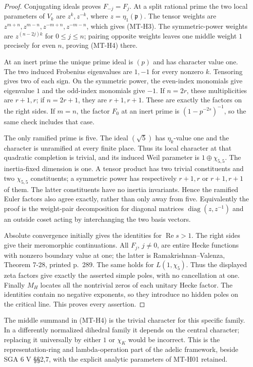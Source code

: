 \begin{proof}
Conjugating ideals proves $F_{-j}=F_j$. At a split rational prime
the two local parameters of $V_k$ are $z^k,z^{-k}$, where
$z=\eta_1(\mathfrak p)$. The tensor weights are
$z^{m+n},z^{m-n},z^{-m+n},z^{-m-n}$, which gives (MT-H3).
The symmetric-power weights are $z^{(n-2j)k}$ for $0\le j\le n$;
pairing opposite weights leaves one middle weight $1$ precisely for
even $n$, proving (MT-H4) there.

At an inert prime the unique prime ideal is $(p)$ and has character
value one. The two induced Frobenius eigenvalues are $1,-1$ for
every nonzero $k$. Tensoring gives two of each sign. On the
symmetric power, the even-index monomials give eigenvalue $1$ and
the odd-index monomials give $-1$. If $n=2r$, these multiplicities
are $r+1,r$; if $n=2r+1$, they are $r+1,r+1$. These are exactly
the factors on the right sides. If $m=n$, the factor $F_0$ at an
inert prime is $(1-p^{-2s})^{-1}$, so the same check includes that
case.

The only ramified prime is five. The ideal $(\sqrt5)$ has
$\eta_k$-value one and the character is unramified at every finite
place. Thus its local character at that quadratic completion is
trivial, and its induced Weil parameter is $1\oplus\chi_{5,5}$.
The inertia-fixed dimension is one. A tensor product has two
trivial constituents and two $\chi_{5,5}$ constituents; a symmetric
power has respectively $r+1,r$ or $r+1,r+1$ of them. The latter
constituents have no inertia invariants. Hence the ramified Euler
factors also agree exactly, rather than only away from five.
Equivalently the proof is the weight-pair decomposition for diagonal
matrices $\operatorname{diag}(z,z^{-1})$ and an outside coset
acting by interchanging the two basis vectors.

Absolute convergence initially gives the identities for
$\operatorname{Re}s>1$. The right sides give their meromorphic
continuations. All $F_j$, $j\ne0$, are entire Hecke functions with
nonzero boundary value at one; the latter is Ramakrishnan--Valenza,
Theorem 7-28, printed p.~289. The same holds for $L(1,\chi_5)$.
Thus the displayed zeta factors give exactly the asserted simple
poles, with no cancellation at one. Finally $M_H$ locates all the
nontrivial zeros of each unitary Hecke factor. The identities contain
no negative exponents, so they introduce no hidden poles on the
critical line. This proves every assertion.
\end{proof}

The middle summand in (MT-H4) is the trivial character for this
specific family. In a differently normalized dihedral family it
depends on the central character; replacing it universally by either
$1$ or $\chi_K$ would be incorrect. This is the representation-ring
and lambda-operation part of the adelic framework, beside SGA 6 V
\S\S2,7, with the explicit analytic parameters of MT-H01 retained.


